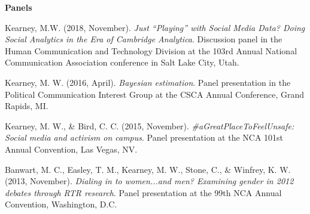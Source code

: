 {\large\textbf{Panels}} \vspace{.5em}

  \begin{bibenum}
    \item[] Kearney, M.W. (2018, November).
      \textit{Just “Playing” with Social Media Data? Doing Social Analytics in the Era of Cambridge Analytica}.
      Discussion panel in the Human Communication and Technology Division at the 103rd Annual National Communication Association conference in Salt Lake City, Utah.
    \item[] Kearney, M. W. (2016, April).
      \textit{Bayesian estimation}.
      Panel presentation in the Political Communication Interest Group at the CSCA Annual Conference, Grand Rapids, MI.
    \item[] Kearney, M. W., \& Bird, C. C. (2015, November).
      \textit{\#aGreatPlaceToFeelUnsafe: Social media and activism on campus}.
      Panel presentation at the NCA 101st Annual Convention, Las Vegas, NV.
    \item[] Banwart, M. C., Easley, T. M., Kearney, M. W., Stone, C., \& Winfrey, K. W. (2013, November).
      \textit{Dialing in to women...and men? Examining gender in 2012 debates through RTR research}.
      Panel presentation at the 99th NCA Annual Convention, Washington, D.C.

  \end{bibenum}

\vspace{1.5em}
